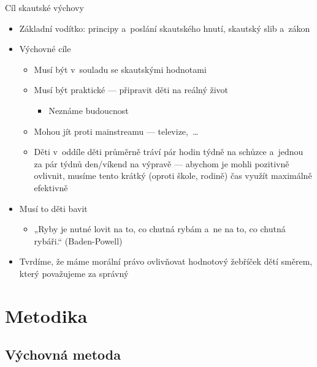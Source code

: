 \documentclass[hyperref={bookmarks=true, unicode=true, colorlinks=true, plainpages=false, pdfkeywords={Skaut, Junak, Skauting, Vychovna metoda}, linkcolor=OrangeRed, anchorcolor=OrangeRed, citecolor=RawSienna, filecolor=RawSienna, menucolor=OrangeRed, urlcolor=RawSienna, pdftex}, compress, xelatex, xcolor=dvipsnames, print]{beamer}
\begin{document}
\begin{frame}{Cíl skautské výchovy}
\begin{itemize}
 \item Základní vodítko: principy a~poslání skautského hnutí, skautský slib a~zákon
 \item Výchovné cíle
 \begin{itemize}
  \item Musí být v~souladu se skautskými hodnotami
  \item Musí být praktické --- připravit děti na reálný život
  \begin{itemize}
   \item Neznáme budoucnost
  \end{itemize}
  \item Mohou jít proti mainstreamu --- televize,~\ldots
 \item Děti v~oddíle děti průměrně tráví pár hodin týdně na schůzce a~jednou za pár týdnů den/víkend na výpravě --- abychom je mohli pozitivně ovlivnit, musíme tento krátký (oproti škole, rodině) čas využít maximálně efektivně
 \end{itemize}
 \item Musí to děti bavit
 \begin{itemize}
 \item „Ryby je nutné lovit na to, co chutná rybám a~ne na to, co chutná rybáři.“ (Baden-Powell)
 \end{itemize}
 \item Tvrdíme, že máme morální právo ovlivňovat hodnotový žebříček dětí směrem, který považujeme za správný
\end{itemize}
\end{frame}

\section{Metodika}

\subsection{Výchovná metoda}
\end{document}
